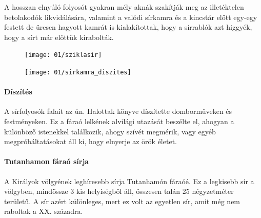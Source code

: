 A hosszan elnyúló folyosót gyakran mély aknák szakítják meg az illetéktelen betolakodók likvidálására, valamint a valódi sírkamra és a kincstár előtt egy-egy festett de üresen hagyott kamrát is kialakítottak, hogy a sírrablók azt higgyék, hogy a sírt már előttük kirabolták.

\begin{figure}
	\begin{minipage}{0.45\textwidth}
		\begin{tcolorbox}[enhanced,colframe=gray!50!white,
			colbacktitle=white!15!white,
			coltitle=gray!50!black,
			borderline={0.5mm}{0mm}{gray!15!white},
			borderline={0.5mm}{0mm}{gray!50!white,dashed},
			attach boxed title to top center={yshift=-2mm},
			boxed title style={boxrule=0.4pt},
			title=Sziklasír belülről]{
				\texttt{[image: 01/sziklasir]}}
		\end{tcolorbox}
	\end{minipage}
	\begin{minipage}{0.45\textwidth}
		\begin{tcolorbox}[enhanced,colframe=gray!50!white,
			colbacktitle=white!15!white,
			coltitle=gray!50!black,
			borderline={0.5mm}{0mm}{gray!15!white},
			borderline={0.5mm}{0mm}{gray!50!white,dashed},
			attach boxed title to top center={yshift=-2mm},
			boxed title style={boxrule=0.4pt},
			title=Tutanhamon sírkamrája]{
				\texttt{[image: 01/sirkamra\_diszites]}}
		\end{tcolorbox}
	\end{minipage}
\end{figure} 

\paragraph{Díszítés}
A sírfolyosók falait az ún. Halottak könyve díszítette domborműveken és festményeken. Ez a fáraó lelkének alvilági utazását beszélte el, ahogyan a különböző istenekkel találkozik, ahogy szívét megmérik, vagy egyéb megpróbáltatásokat áll ki, hogy elnyerje az örök életet.

\paragraph{Tutanhamon fáraó sírja}
A Királyok völgyének leghíresebb sírja Tutanhamón fáraóé. Ez a legkisebb sír a völgyben, mindössze 3 kis helyiségből áll, összesen talán 25 négyzetméter területű. A sír azért különleges, mert ez volt az egyetlen sír, amit még nem raboltak a XX. századra.

